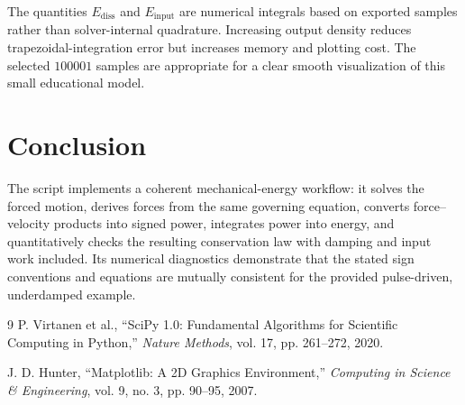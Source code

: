 \documentclass[11pt]{article}
\begin{document}
The quantities $E_{\mathrm{diss}}$ and $E_{\mathrm{input}}$ are numerical integrals based on exported samples rather than solver-internal quadrature. Increasing output density reduces trapezoidal-integration error but increases memory and plotting cost. The selected $100001$ samples are appropriate for a clear smooth visualization of this small educational model.

\section{Conclusion}
The script implements a coherent mechanical-energy workflow: it solves the forced motion, derives forces from the same governing equation, converts force--velocity products into signed power, integrates power into energy, and quantitatively checks the resulting conservation law with damping and input work included. Its numerical diagnostics demonstrate that the stated sign conventions and equations are mutually consistent for the provided pulse-driven, underdamped example.

\begin{thebibliography}{9}
P. Virtanen et al., ``SciPy 1.0: Fundamental Algorithms for Scientific Computing in Python,'' \emph{Nature Methods}, vol. 17, pp. 261--272, 2020.

J. D. Hunter, ``Matplotlib: A 2D Graphics Environment,'' \emph{Computing in Science \& Engineering}, vol. 9, no. 3, pp. 90--95, 2007.
\end{thebibliography}
\end{document}

